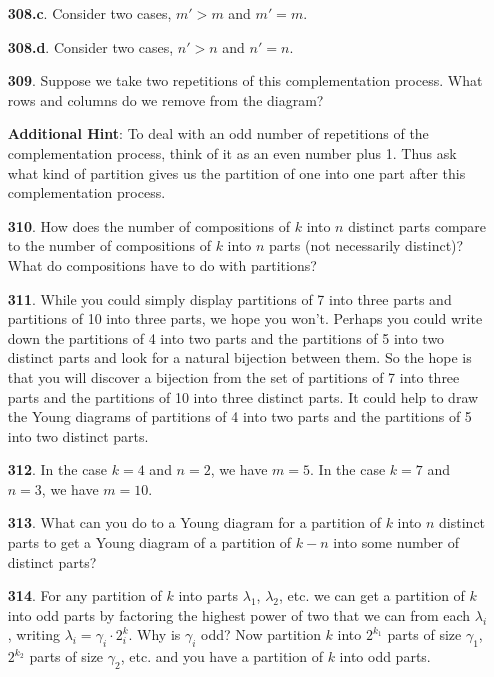 \documentclass[10pt,]{book}
\theoremstyle{plain}
\theoremstyle{definition}
\theoremstyle{definition}
\theoremstyle{definition}
\numberwithin{equation}{chapter}
\newcommand{\gt}{>}
\begin{document}
\begin{itemize}[itemsep=1em]
\item[\textbf{308.c}.]\hypertarget{p-1522}{}%
Consider two cases, \(m' \gt m\) and \(m' = m\).%

\item[\textbf{308.d}.]\hypertarget{p-1525}{}%
Consider two cases, \(n' \gt n\) and \(n' = n\).%

\item[\textbf{309}.]\hypertarget{p-1532}{}%
Suppose we take two repetitions of this complementation process. What rows and columns do we remove from the diagram?%

\par\smallskip
\noindent\textbf{Additional Hint}: \hypertarget{p-1533}{}%
To deal with an odd number of repetitions of the complementation process, think of it as an even number plus 1. Thus ask what kind of partition gives us the partition of one into one part after this complementation process.%

\item[\textbf{310}.]\hypertarget{p-1540}{}%
How does the number of compositions of \(k\) into \(n\) distinct parts compare to the number of compositions of \(k\) into \(n\) parts (not necessarily distinct)? What do compositions have to do with partitions?%

\item[\textbf{311}.]\hypertarget{p-1543}{}%
While you could simply display partitions of 7 into three parts and partitions of 10 into three parts, we hope you won't. Perhaps you could write down the partitions of 4 into two parts and the partitions of 5 into two distinct parts and look for a natural bijection between them. So the hope is that you will discover a bijection from the set of partitions of 7 into three parts and the partitions of 10 into three distinct parts. It could help to draw the Young diagrams of partitions of 4 into two parts and the partitions of 5 into two distinct parts.%

\item[\textbf{312}.]\hypertarget{p-1546}{}%
In the case \(k=4\) and \(n=2\), we have \(m=5\). In the case \(k = 7\) and \(n = 3\), we have \(m = 10\).%

\item[\textbf{313}.]\hypertarget{p-1549}{}%
What can you do to a Young diagram for a partition of \(k\) into \(n\) distinct parts to get a Young diagram of a partition of \(k-n\) into some number of distinct parts?%

\item[\textbf{314}.]\hypertarget{p-1552}{}%
For any partition of \(k\) into parts \(\lambda_1\), \(\lambda_2\), etc. we can get a partition of \(k\) into odd parts by factoring the highest power of two that we can from each \(\lambda_i\), writing \(\lambda_i = \gamma_i\cdot 2^k_i\).  Why is \(\gamma_i\) odd? Now partition \(k\) into \(2^{k_1}\) parts of size \(\gamma_1\), \(2^{k_2}\) parts of size \(\gamma_2\), etc. and you have a partition of \(k\) into odd parts.%


\end{itemize}
\end{document}
